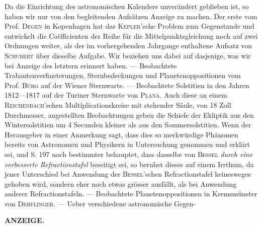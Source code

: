 Da die Einrichtung des astronomischen Kalenders unverändert geblieben ist, so haben wir nur von den begleitenden Aufsätzen Anzeige zu machen. Der erste vom Prof. \textsc{Degen} in Kopenhagen hat das \textsc{Kepler}'sche Problem zum Gegenstande und entwickelt die Coëfficienten der Reihe für die Mittelpunktsgleichung noch auf zwei Ordnungen weiter, als der im vorhergehenden Jahrgange enthaltene Aufsatz von \textsc{Schubert} über dieselbe Aufgabe. Wir beziehen uns dabei auf dasjenige, was wir bei Anzeige des letztern erinnert haben. --- Beobachtete Trabantenverfinsterungen, Sternbedeckungen und Planetenoppositionen vom Prof. \textsc{Bürg} auf der Wiener Sternwarte. --- Beobachtete Solstitien in den Jahren 1812---1817 auf der Turiner Sternwarte von \textsc{Plana}. Auch diese an einem \textsc{Reichenbach}'schen Multiplicationskreise mit stehender Säule, von 18 Zoll Durchmesser, angestellten Beobachtungen geben die Schiefe der Ekliptik aus den Wintersolstitien um 4 Secunden kleiner als aus den Sommersolstitien. Wenn der Herausgeber in einer Anmerkung sagt, dass dies so merkwürdige Phänomen bereits von Astronomen und Physikern in Untersuchung genommen und erklärt sei, und S. 197 noch bestimmter behauptet, dass dasselbe von \textsc{Bessel} \emph{durch eine verbesserte Refractionstafel} beseitigt sei, so beruhet dieses auf einem Irrthum, da jener Unterschied bei Anwendung der \textsc{Bessel}'schen Refractionstafel keinesweges gehoben wird, sondern eher noch etwas grösser ausfällt, als bei Anwendung anderer Refractionstafeln. --- Beobachtete Planetenoppositionen in Kremsmünster von \textsc{Derflinger}. --- Ueber verschiedene astronomische Gegen-\par
\clearpage
{}
\noindent{}%
\parbox[b]{\dimexpr\textwidth-20mm\relax}{\centering\small\textbf{ANZEIGE.}}%
\makebox[10mm][r]{}\par\nobreak\medskip

